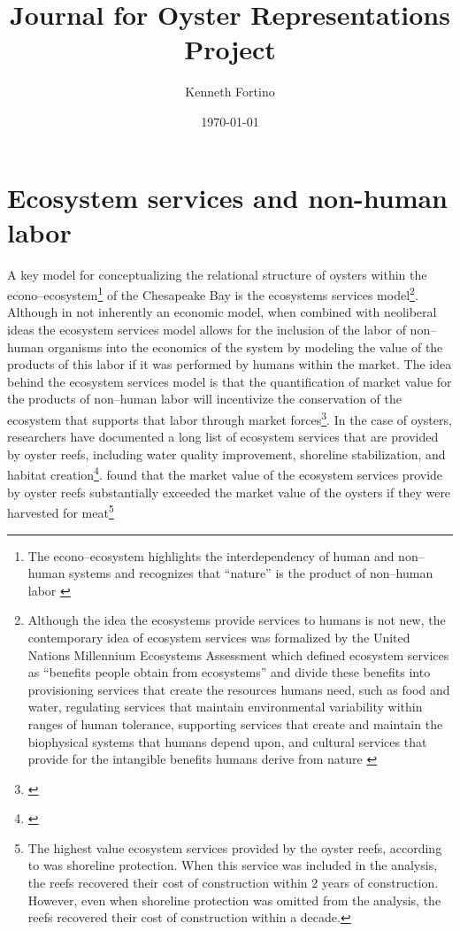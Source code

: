 \documentclass{article}
\begin{document}
\title{Journal for Oyster Representations Project}
\author{Kenneth Fortino}
\date{\today}

\maketitle

\section{Ecosystem services and non-human labor}

A key model for conceptualizing the relational structure of oysters within the econo--ecosystem\footnote{The econo--ecosystem highlights the interdependency of human and non--human systems and recognizes that ``nature'' is the product of non--human labor \cite{gibson-graham_non-human_2020}} of the Chesapeake Bay is the ecosystems services model\footnote{Although the idea the ecosystems provide services to humans is not new, the contemporary idea of ecosystem services was formalized by the United Nations Millennium Ecosystems Assessment which defined ecosystem services as ``benefits people obtain from ecosystems'' and divide these benefits into provisioning services that create the resources humans need, such as food and water, regulating services that maintain environmental variability within ranges of human tolerance, supporting services that create and maintain the biophysical systems that humans depend upon, and cultural services that provide for the intangible benefits humans derive from nature \cite{reid_millennium_2005}}. Although in not inherently an economic model, when combined with neoliberal ideas the ecosystem services model allows for the inclusion of the labor of non--human organisms into the economics of the system by modeling the value of the products of this labor if it was performed by humans within the market\cite{costanza_value_1998}. The idea behind the ecosystem services model is that the quantification of market value for the products of non--human labor will incentivize the conservation of the ecosystem that supports that labor  through market forces\footnote{\cite{costanza_value_1998}}. In the case of oysters, researchers have documented a long list of ecosystem services that are provided by oyster reefs, including water quality improvement, shoreline stabilization, and habitat creation\footnote{\cite{grabowski_economic_2012, coen_oyster_date}}. \citeauthor{grabowski_economic_2012} found that the market value of the ecosystem services provide by oyster reefs substantially exceeded the market value of the oysters if they were harvested for meat\footnote{The highest value ecosystem services  provided by the oyster reefs, according to \cite{grabowski_economic_2012} was shoreline protection. When this service was included in the analysis, the reefs recovered their cost of construction within 2 years of construction. However, even when shoreline protection was omitted from the analysis, the reefs recovered their cost of construction within a decade.} 
\end{document}
